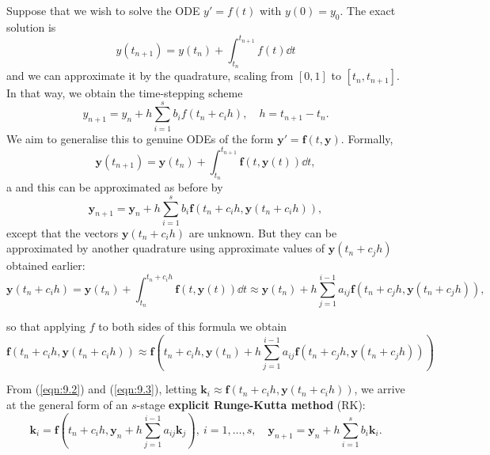 \documentclass[a4paper]{article}
\begin{document}
Suppose that we wish to solve the ODE $ y' = f(t) $ with $y(0) = y_0$. The exact solution is 
\[
    y(t_{n+1}) = y(t_n) + \int_{t_n}^{t_{n+1}} f(t) \dd{t}
\]
and we can approximate it by the quadrature, scaling from $[0,1]$ to $[t_n,t_{n+1}]$. In that way, we obtain the time-stepping scheme 
\[
    y_{n+1}=y_n+h \sum_{i=1}^s b_i f(t_n+c_i h), \quad h=t_{n+1}-t_n .
\]
We aim to generalise this to genuine ODEs of the form $ \mathbf{y}' = \mathbf{f}(t,\mathbf{y}) $. Formally,
\[
    \mathbf{y}(t_{n+1}) = \mathbf{y}(t_n) + \int_{t_n}^{t_{n+1}} \mathbf{f}(t,\mathbf{y}(t)) \dd{t},
\]a
and this can be approximated as before by 
\begin{equation}\label{eqn:9.2}
    \mathbf{y}_{n+1} = \mathbf{y}_n + h \sum_{i=1}^{s} b_i \mathbf{f}(t_n + c_i h, \mathbf{y}(t_n+c_i h)),
\end{equation}
except that the vectors $ \mathbf{y}(t_n+c_i h) $ are unknown. But they can be approximated by another quadrature using approximate values of $\mathbf{y}(t_n+c_j h)$ obtained earlier:
\[
    \mathbf{y}\left(t_n+c_i h\right)=\mathbf{y}\left(t_n\right)+\int_{t_n}^{t_n+c_i h} \mathbf{f}(t, \mathbf{y}(t)) \dd{t} \approx \mathbf{y}\left(t_n\right)+h \sum_{j=1}^{i-1} a_{i j} \mathbf{f}\left(t_n+c_j h, \mathbf{y}\left(t_n+c_j h\right)\right),
\]

so that applying $f$ to both sides of this formula we obtain
\begin{equation}\label{eqn:9.3}
    \mathbf{f}\left(t_n+c_i h, \mathbf{y}\left(t_n+c_i h\right)\right) \approx \mathbf{f}\left(t_n+c_i h, \mathbf{y}\left(t_n\right)+h \sum_{j=1}^{i-1} a_{i j} \mathbf{f}\left(t_n+c_j h, \mathbf{y}\left(t_n+c_j h\right)\right)\right)
\end{equation}

\begin{method}
    From (\ref{eqn:9.2}) and (\ref{eqn:9.3}), letting $ \mathbf{k}_i \approx \mathbf{f}(t_n+c_i h, \mathbf{y}(t_n+c_i h)) $, we arrive at the general form of an $s$-stage \textbf{explicit Runge-Kutta method} (RK):
    \[
        \mathbf{k}_i = \mathbf{f}\left( t_n + c_i h, \mathbf{y}_n + h \sum_{j=1}^{i-1}a_{ij}\mathbf{k}_j \right),\ i = 1, \dots, s,\quad 
        \mathbf{y}_{n+1} = \mathbf{y}_n + h \sum_{i=1}^{s} b_i \mathbf{k}_i.
    \]
\end{method}
\end{document}
